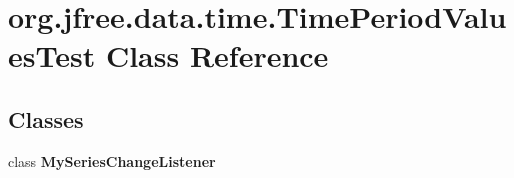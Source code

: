 \hypertarget{classorg_1_1jfree_1_1data_1_1time_1_1_time_period_values_test}{}\section{org.\+jfree.\+data.\+time.\+Time\+Period\+Values\+Test Class Reference}
\label{classorg_1_1jfree_1_1data_1_1time_1_1_time_period_values_test}
\subsection*{Classes}
\begin{DoxyCompactItemize}
\item 
class {\bfseries My\+Series\+Change\+Listener}
\end{DoxyCompactItemize}
